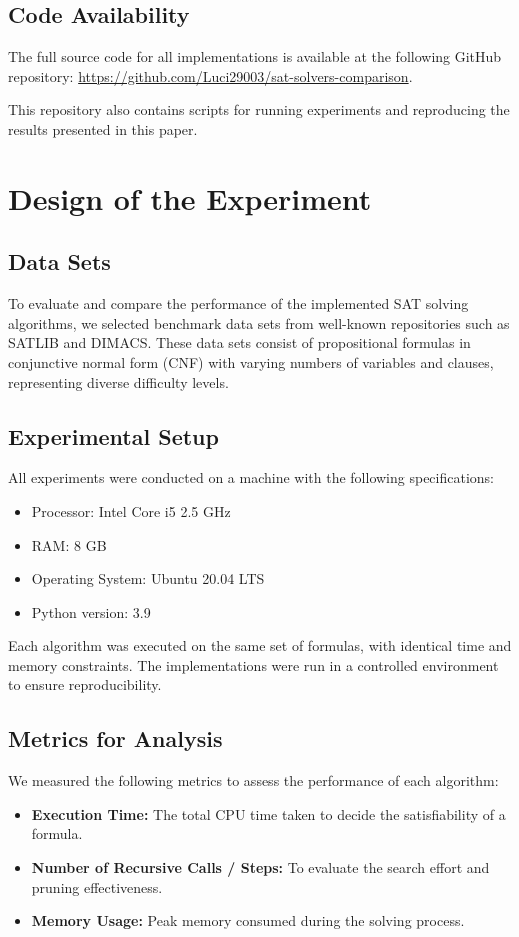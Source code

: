 \documentclass{article}
\begin{document}
\subsection{Code Availability}
The full source code for all implementations is available at the following GitHub repository: \url{https://github.com/Luci29003/sat-solvers-comparison}.

This repository also contains scripts for running experiments and reproducing the results presented in this paper.

\section{Design of the Experiment}

\subsection{Data Sets}
To evaluate and compare the performance of the implemented SAT solving algorithms, we selected benchmark data sets from well-known repositories such as SATLIB and DIMACS. These data sets consist of propositional formulas in conjunctive normal form (CNF) with varying numbers of variables and clauses, representing diverse difficulty levels.

\subsection{Experimental Setup}
All experiments were conducted on a machine with the following specifications:
\begin{itemize}
    \item Processor: Intel Core i5 2.5 GHz
    \item RAM: 8 GB
    \item Operating System: Ubuntu 20.04 LTS
    \item Python version: 3.9
\end{itemize}

Each algorithm was executed on the same set of formulas, with identical time and memory constraints. The implementations were run in a controlled environment to ensure reproducibility.

\subsection{Metrics for Analysis}
We measured the following metrics to assess the performance of each algorithm:
\begin{itemize}
    \item \textbf{Execution Time:} The total CPU time taken to decide the satisfiability of a formula.
    \item \textbf{Number of Recursive Calls / Steps:} To evaluate the search effort and pruning effectiveness.
    \item \textbf{Memory Usage:} Peak memory consumed during the solving process.
\end{itemize}
\end{document}
